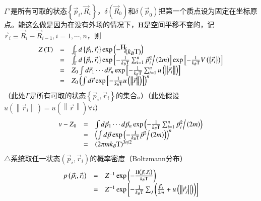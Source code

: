 \documentclass{article} %
\begin{document}
\noindent $\Gamma '$是所有可取的状态$\left\{\vec{p}_{i} ,\vec{R}_{i} \right\}$，$\delta \left(\vec{R}_{0} \right)$和$\delta \left(\vec{p}_{0} \right)$把第一个质点设为固定在坐标原点。能这么做是因为在没有外场的情况下，${\rm H} $是空间平移不变的，记$\vec{r}_{i} \equiv \vec{R}_{i} -\vec{R}_{i-1} ,i=1,\cdots ,n$，则
\[\begin{array}{rcl} {Z\left({\rm T} \right)} & {=} & {\int _{\Gamma }d\left\{\vec{p}_{i} ,\vec{r}_{i} \right\} \exp \left(-{\raise0.7ex\hbox{$ {\rm H}  $}\!\mathord{\left/ {\vphantom {{\rm H}  \left(k_{B} {\rm T} \right)}} \right. \kern-\nulldelimiterspace}\!\lower0.7ex\hbox{$ \left(k_{B} {\rm T} \right) $}} \right)} \\ {} & {=} & {\int _{\Gamma }d\left\{\vec{p}_{i} ,\vec{r}_{i} \right\} \exp \left[-\frac{1}{k_{B} {\rm T} } \sum _{i=1}^{n}{\vec{p}_{i}^{2} \mathord{\left/ {\vphantom {\vec{p}_{i}^{2}  \left(2m\right)}} \right. \kern-\nulldelimiterspace} \left(2m\right)}  \right]\exp \left[-\frac{1}{k_{B} {\rm T} } V\left(\left\{\vec{r}_{i} \right\}\right)\right]} \\ {} & {=} & {Z_{0} \int d\vec{r}_{1} \cdots d\vec{r}_{n}  \exp \left[-\frac{1}{k_{B} {\rm T} } \sum _{i=1}^{n}u\left(\left\| \vec{r}_{i} \right\| \right) \right]} \\ {} & {=} & {Z_{0} \left(\int d\vec{r}\exp \left[-\frac{1}{k_{B} {\rm T} } u\left(\left\| \vec{r}\right\| \right)\right] \right)^{n} } \end{array}\] 
（此处$\Gamma $是所有可取的状态$\left\{\vec{p}_{i} ,\vec{r}_{i} \right\}$的集合。）（此处假设$u\left(\left\| \vec{r}_{i} \right\| \right)=u\left(\left\| \vec{r}\right\| \right)\forall i$）
\[\begin{array}{rcl} {v-Z{}_{0} } & {=} & {\int d\vec{p}_{1} \cdots d\vec{p}_{n}  \exp \left(-\frac{1}{k_{B} {\rm T} } \sum _{i=1}^{n}{\vec{p}_{i}^{2} \mathord{\left/ {\vphantom {\vec{p}_{i}^{2}  \left(2m\right)}} \right. \kern-\nulldelimiterspace} \left(2m\right)}  \right)} \\ {} & {=} & {\left(\int d\vec{p} \exp \left(-\frac{1}{k_{B} {\rm T} } {\vec{p}_{}^{2} \mathord{\left/ {\vphantom {\vec{p}_{}^{2}  \left(2m\right)}} \right. \kern-\nulldelimiterspace} \left(2m\right)} \right)\right)^{n} } \\ {} & {=} & {\left(2\pi mk_{B} {\rm T} \right)^{{3n\mathord{\left/ {\vphantom {3n 2}} \right. \kern-\nulldelimiterspace} 2} } } \end{array}\] 
$\mathrm{\triangle}$系统取任一状态$\left(\vec{p}_{i} ,\vec{r}_{i} \right)$的概率密度（Boltzmann分布）
\[\begin{array}{rcl} {p\left(\vec{p}_{i} ,\vec{r}_{i} \right)} & {=} & {Z^{-1} \exp \left(-\frac{{\rm H} \left(\vec{p}_{i} ,\vec{r}_{i} \right)}{k_{B} {\rm T} } \right)} \\ {} & {=} & {Z^{-1} \exp \left[-\frac{1}{k_{B} {\rm T} } \sum _{j}\left(\frac{\vec{p}_{j} }{2m} +u\left(\left\| \vec{r}_{j} \right\| \right)\right) \right]} \end{array}\] 
\end{document}

